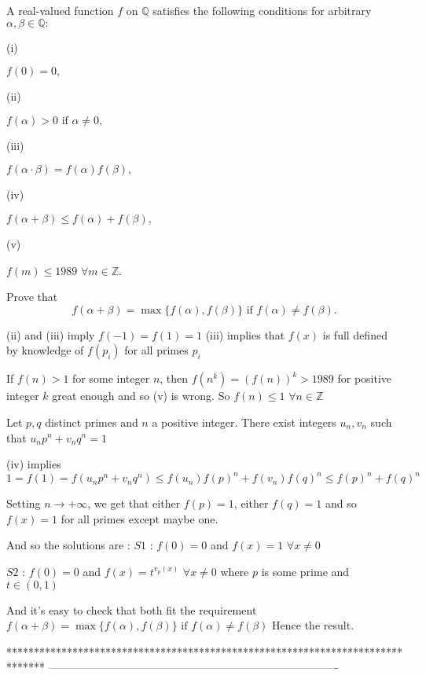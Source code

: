 \begin{solution}
	\begin{tcolorbox}A real-valued function $ f$ on $ \mathbb{Q}$ satisfies the following conditions for arbitrary $ \alpha, \beta \in \mathbb{Q}:$

\begin{bolded}(i)\end{bolded} $ f(0) = 0,$
\begin{bolded}(ii)\end{bolded} $ f(\alpha) > 0 \text{ if } \alpha \neq 0,$
\begin{bolded}(iii)\end{bolded} $ f(\alpha \cdot \beta) = f(\alpha)f(\beta),$ 
\begin{bolded}(iv)\end{bolded} $ f(\alpha + \beta) \leq f(\alpha) + f(\beta),$
\begin{bolded}(v)\end{bolded} $ f(m) \leq 1989$ $ \forall m \in  \mathbb{Z}.$

Prove that \[ f(\alpha + \beta) = \max\{f(\alpha), f(\beta)\} \text{ if } f(\alpha) \neq f(\beta).\]\end{tcolorbox}
(ii) and (iii) imply  $f(-1)=f(1)=1$
(iii) implies that $f(x)$ is full defined by knowledge of $f(p_i)$ for all primes $p_i$

If $f(n)>1$ for some integer $n$, then $f(n^k)=(f(n))^k>1989$ for positive integer $k$ great enough and so (v) is wrong. So $f(n)\le 1$ $\forall n\in\mathbb Z$

Let $p,q$ distinct primes and $n$ a positive integer. There exist integers $u_n,v_n$ such that $u_np^n+v_nq^n=1$

(iv) implies $1=f(1)=f(u_np^n+v_nq^n)\le f(u_n)f(p)^n+f(v_n)f(q)^n\le f(p)^n+f(q)^n$

Setting $n\to +\infty$, we get that either $f(p)=1$, either $f(q)=1$ and so $f(x)=1$ for all primes except maybe one.

And so the solutions are :
$S1$ : $f(0)=0$ and $f(x)=1$ $\forall x\ne 0$ 

$S2$ : $f(0)=0$ and $f(x)=t^{v_p(x)}$ $\forall x\ne 0$ where $p$ is some prime and $t\in(0,1)$

And it's easy to check that both fit the requirement $f(\alpha + \beta) = \max\{f(\alpha), f(\beta)\} \text{ if } f(\alpha) \neq f(\beta)$
Hence the result.
\end{solution}
*******************************************************************************
-------------------------------------------------------------------------------

